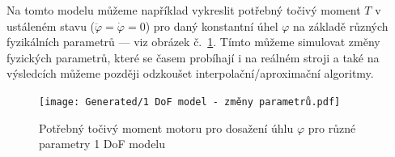 Na tomto modelu můžeme například vykreslit potřebný točivý moment $T$ v ustáleném stavu ($\ddot{\varphi} = \dot{\varphi} = 0$) pro daný konstantní úhel $\varphi$ na základě různých fyzikálních parametrů --- viz obrázek č.~\ref{fig:1 DoF pro různé parametry}. Tímto můžeme simulovat změny fyzických parametrů, které se časem probíhají i na reálném stroji a také na výsledcích můžeme později odzkoušet interpolační/aproximační algoritmy.
\begin{figure}[H]
    \centering
    \texttt{[image: Generated/1 DoF model - změny parametrů.pdf]}
    \caption{Potřebný točivý moment motoru pro dosažení úhlu $\varphi$ pro různé parametry 1 DoF modelu}
    \label{fig:1 DoF pro různé parametry}
\end{figure}